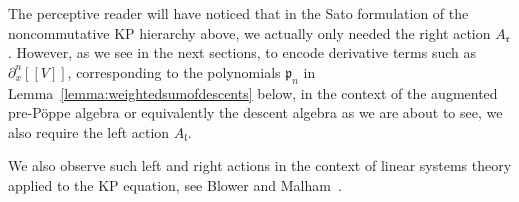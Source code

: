 \documentclass[5p,twocolumn]{elsarticle}
\newcommand*{\pa}{{\partial}}
\newcommand*{\lb}{[\![}
\newcommand*{\rb}{]\!]}
\newcommand*{\el}{\mathfrak l}
\newcommand*{\rl}{\mathfrak r}
\newcommand*{\pf}{\mathfrak p}
\begin{document}
%
\begin{remark}
  The perceptive reader will have noticed that in the Sato formulation of the noncommutative KP hierarchy above, we actually only needed the right action $A_{\rl}$.
  However, as we see in the next sections, to encode derivative terms such as $\pa_x^n\lb V\rb$,
  corresponding to the polynomials $\pf_n$ in Lemma~\ref{lemma:weightedsumofdescents} below, in the context of the augmented pre-P\"oppe algebra
  or equivalently the descent algebra as we are about to see, we also require the left action $A_{\el}$.
\end{remark}
%
\begin{remark}
  We also observe such left and right actions in the context of linear systems theory applied to the KP equation, see Blower and Malham~\cite{BM-KP-LS}.
\end{remark}
\end{document}
